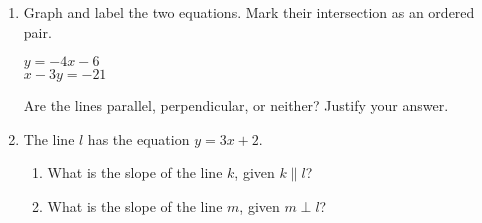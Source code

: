 \begin{enumerate}
\newpage
\item Graph and label the two equations. Mark their intersection as an ordered pair.
  \begin{multicols}{2}
    $y = -4x-6$ \\
    $x-3y = -21$
  \end{multicols}  \vspace{1cm}
  Are the lines parallel, perpendicular, or neither? Justify your answer.
  \vspace{1.5cm}
  \begin{center} %
  \end{center}

\item The line $l$ has the equation $y= 3x+2$.
  \begin{enumerate}
    \item What is the slope of the line $k$, given $k \parallel l$?
    \vspace{1cm}
    \item What is the slope of the line $m$, given $m \perp l$?
    \vspace{1cm}
  \end{enumerate}

\end{enumerate}
